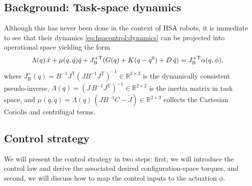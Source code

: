 \subsection{Background: Task-space dynamics}\label{sub:hsacontrol:task_space_dynamics}
%
Although this has never been done in the context of HSA robots, it is immediate to see that their dynamics \eqref{eq:hsacontrol:dynamics} can be projected into operational space yielding the form~\cite{della2019exact, della2020model} %
\begin{equation}\label{eq:hsacontrol:operational_space_dynamics}
    \Lambda(q) \, \Ddot{x} + \mu(q,\dot{q}) \dot{q} + J_\mathrm{B}^{+\mathrm{T}} ( G(q) + K (q-q^0) + D \, \dot{q} ) = J_\mathrm{B}^{+\mathrm{T}} \alpha(q,\phi),
\end{equation}
where $J_\mathrm{B}^+(q) = B^{-1}J^\mathrm{T}(J B^{-1} J^\mathrm{T})^{-1} \in \mathbb{R}^{3\times2}$ is the dynamically consistent pseudo-inverse, $\Lambda(q) = (J \, B^{-1} J^\mathrm{T})^{-1} \in \mathbb{R}^{2 \times 2}$ is the inertia matrix in task space, and $\mu(q, \dot{q}) = \Lambda(q) \, (J B^{-1} C - \dot{J}) \in \mathbb{R}^{2 \times 3}$ collects the Cartesian Coriolis and centrifugal terms. %

\subsection{Control strategy}\label{sub:hsacontrol:task_space_impedance_control:control_strategy}
%
We will present the control strategy in two steps: first, we will introduce the control law and derive the associated desired configuration-space torques, and second, we will discuss how to map the control inputs to the actuation $\phi$.

